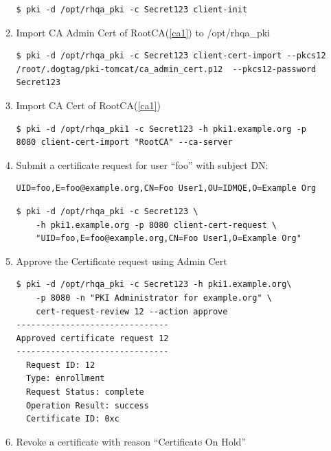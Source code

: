\documentclass[12pt]{report}
\begin{document}
\begin{enumerate}[label*=\arabic*.]
\begin{enumerate}[label*=\arabic*.]
\begin{lstlisting}[style=bashInputStyle]
$ pki -d /opt/rhqa_pki -c Secret123 client-init                                    
                    \end{lstlisting}
                \item \label{pki2} Import CA Admin Cert of RootCA(\ref{ca1}) to /opt/rhqa\_pki
                    \begin{lstlisting}[style=bashInputStyle]
$ pki -d /opt/rhqa_pki -c Secret123 client-cert-import --pkcs12 /root/.dogtag/pki-tomcat/ca_admin_cert.p12  --pkcs12-password Secret123                                    
                    \end{lstlisting}
                \item \label{pki3} Import CA Cert of RootCA(\ref{ca1})
                    \begin{lstlisting}[style=bashInputStyle]
$ pki -d /opt/rhqa_pki1 -c Secret123 -h pki1.example.org -p 8080 client-cert-import "RootCA" --ca-server                                    
                    \end{lstlisting}
                \item \label{pki4} Submit a certificate request for user ``foo'' with subject DN:
                    \begin{lstlisting}
UID=foo,E=foo@example.org,CN=Foo User1,OU=IDMQE,O=Example Org
                    \end{lstlisting}
                    \begin{lstlisting}[style=bashInputStyle]
$ pki -d /opt/rhqa_pki -c Secret123 \
    -h pki1.example.org -p 8080 client-cert-request \
    "UID=foo,E=foo@example.org,CN=Foo User1,O=Example Org" 
                    \end{lstlisting}
                \item \label{pki5} Approve the Certificate request using Admin Cert
                    \begin{lstlisting}[style=bashInputStyle]
$ pki -d /opt/rhqa_pki -c Secret123 -h pki1.example.org\
    -p 8080 -n "PKI Administrator for example.org" \
    cert-request-review 12 --action approve
-------------------------------
Approved certificate request 12
-------------------------------
  Request ID: 12
  Type: enrollment
  Request Status: complete
  Operation Result: success
  Certificate ID: 0xc
                    \end{lstlisting}
                \item Revoke a certificate with reason ``Certificate On Hold''
                    \begin{lstlisting}[style=bashInputStyle]

\end{lstlisting}
\end{enumerate}
\end{enumerate}
\end{document}
